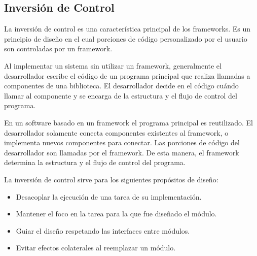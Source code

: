 \subsection{Inversión de Control}
\label{sec:inversion_control}
La inversión de control es una característica principal de los
frameworks. Es un principio de diseño en el cual porciones de código
personalizado por el usuario son controladas por un framework.

Al implementar un sistema sin utilizar un framework, generalmente el
desarrollador escribe el código de un programa principal que realiza llamadas a
componentes de una biblioteca. El desarrollador decide en el código cuándo
llamar al componente y se encarga de la estructura y el flujo de control del
programa.

En un software basado en un framework el programa principal es reutilizado. 
El desarrollador solamente conecta componentes existentes al framework, o
implementa nuevos componentes para conectar. Las porciones de código del
desarrollador son llamadas por el framework. De esta manera, el framework
determina la estructura y el flujo de control del programa.

La inversión de control sirve para los siguientes propósitos de diseño:
\begin{itemize}
  \item Desacoplar la ejecución de una tarea de su implementación.
  \item Mantener el foco en la tarea para la que fue diseñado el módulo.
  \item Guiar el diseño respetando las interfaces entre módulos.
  \item Evitar efectos colaterales al reemplazar un módulo.
\end{itemize}

